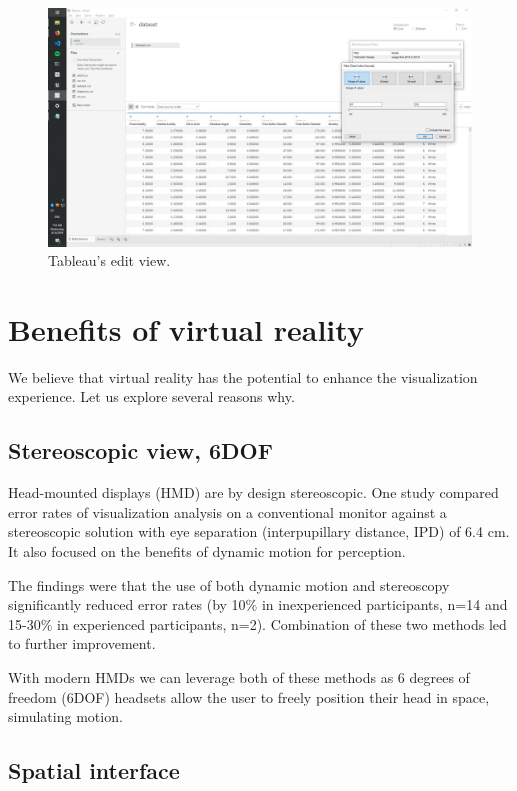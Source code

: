 \documentclass[thesis=M,english,hidelinks]{FITthesisXE}[2012/06/26]
\begin{document}
\begin{figure}[ht]
\centering
\includegraphics[scale=0.2]{tableau_edit}
\caption{Tableau's edit view.}
\label{fig:tableau_edit}
\end{figure}

\newpage

\section{Benefits of virtual reality}

We believe that virtual reality has the potential to enhance the visualization experience. Let us explore several reasons why.

\subsection{Stereoscopic view, 6DOF}

Head-mounted displays (HMD) are by design stereoscopic. One study compared error rates of visualization analysis on a conventional monitor against a stereoscopic solution with eye separation (interpupillary distance, IPD) of 6.4 cm. It also focused on the benefits of dynamic motion for perception.

The findings were that the use of both dynamic motion and stereoscopy significantly reduced error rates (by 10\% in inexperienced participants, n=14 and 15-30\% in experienced participants, n=2). Combination of these two methods led to further improvement.\autocite{ware}

With modern HMDs we can leverage both of these methods as 6 degrees of freedom (6DOF) headsets allow the user to freely position their head in space, simulating motion.

\subsection{Spatial interface}
\end{document}
